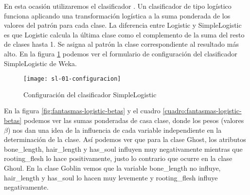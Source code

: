 En esta ocasión utilizaremos el clasificador . Un clasificador de tipo logístico funciona aplicando una transformación logística a la suma ponderada de los valores del patrón para cada clase. La diferencia entre Logistic y SimpleLogistic es que Logistic calcula la última clase como el complemento de la suma del resto de clases hasta 1. Se asigna al patrón la clase correspondiente al resultado más alto. En la figura \ref{fig:sl-configuracion} podemos ver el formulario de configuración del clasificador SimpleLogistic de Weka.

\begin{figure}[ht]
    \centering
    \texttt{[image: sl-01-configuracion]}
    \caption{Configuración del clasificador SimpleLogistic}
    \label{fig:sl-configuracion}
\end{figure}

En la figura \ref{fig:fantasmas-logistic-betas} y el cuadro \ref{cuadro:fantasmas-logistic-betas} podemos ver las sumas ponderadas de casa clase, donde los pesos (valores $\beta$) nos dan una idea de la influencia de cada variable independiente en la determinación de la clase. Así podemos ver que para la clase Ghost, los atributos bone\_length, hair\_length y has\_soul influyen muy negativamente mientras que rooting\_flesh lo hace positivamente, justo lo contrario que ocurre en la clase Ghoul. En la clase Goblin vemos que la variable bone\_length no influye, hair\_length y has\_soul lo hacen muy levemente y rooting\_flesh influye negativamente.

